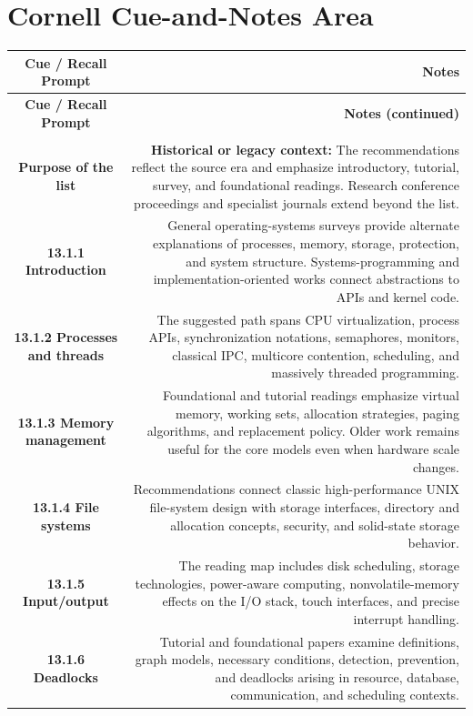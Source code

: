 \documentclass[10pt,letterpaper]{article}
\begin{document}
\section*{Cornell Cue-and-Notes Area}
\small
\begin{longtable}{C N}
\color{white}\textbf{Cue / Recall Prompt} &
\color{white}\textbf{Notes}\\
\endfirsthead
{}
\color{white}\textbf{Cue / Recall Prompt} &
\color{white}\textbf{Notes (continued)}\\
\endhead
{}\\*\hline
\textbf{Purpose of the list} & \textcolor{legacy}{\textbf{Historical or legacy context:}} The recommendations reflect the source era and emphasize introductory, tutorial, survey, and foundational readings. Research conference proceedings and specialist journals extend beyond the list.\\\hline
\textbf{13.1.1 Introduction} & General operating-systems surveys provide alternate explanations of processes, memory, storage, protection, and system structure. Systems-programming and implementation-oriented works connect abstractions to APIs and kernel code.\\\hline
\textbf{13.1.2 Processes and threads} & The suggested path spans CPU virtualization, process APIs, synchronization notations, semaphores, monitors, classical IPC, multicore contention, scheduling, and massively threaded programming.\\\hline
\textbf{13.1.3 Memory management} & Foundational and tutorial readings emphasize virtual memory, working sets, allocation strategies, paging algorithms, and replacement policy. Older work remains useful for the core models even when hardware scale changes.\\\hline
\textbf{13.1.4 File systems} & Recommendations connect classic high-performance UNIX file-system design with storage interfaces, directory and allocation concepts, security, and solid-state storage behavior.\\\hline
\textbf{13.1.5 Input/output} & The reading map includes disk scheduling, storage technologies, power-aware computing, nonvolatile-memory effects on the I/O stack, touch interfaces, and precise interrupt handling.\\\hline
\textbf{13.1.6 Deadlocks} & Tutorial and foundational papers examine definitions, graph models, necessary conditions, detection, prevention, and deadlocks arising in resource, database, communication, and scheduling contexts.\\\hline

\end{longtable}
\end{document}
